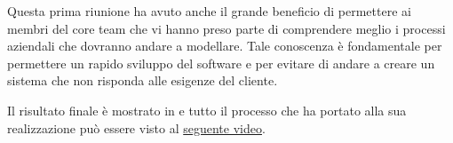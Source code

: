 Questa prima riunione ha avuto anche il grande beneficio di permettere ai membri del core team che vi hanno preso parte di comprendere meglio i processi aziendali che dovranno andare a modellare. Tale conoscenza è fondamentale per permettere un rapido sviluppo del software e per evitare di andare a creare un sistema che non risponda alle esigenze del cliente.

Il risultato finale è mostrato in   e tutto il processo che ha portato alla sua realizzazione può essere visto al \href{https://youtu.be/BvkPYtI8MF8}{seguente video}.

